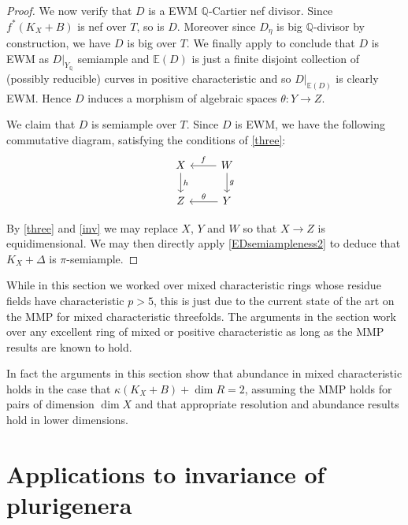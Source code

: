 \documentclass[a4paper,12pt]{book}
\begin{document}
\begin{proof}
		We now verify that $D$ is a EWM $\mathbb{Q}$-Cartier nef divisor.
		Since $f^{*}(K_{X}+B)$ is nef over $T$, so is $D$. Moreover since $D_\eta$ is big $\mathbb{Q}$-divisor by construction, we have $D$ is big over $T$. 
		We finally apply \cite[Theorem 6.1]{witaszek2020keels} to conclude that $D$ is EWM as $D|_{Y_{\mathbb{Q}}}$ semiample and ${\mathbb{E}(D)}$ is just a finite disjoint collection of (possibly reducible) curves in positive characteristic and so $D|_{\mathbb{E}(D)}$ is clearly EWM. Hence $D$ induces a morphism of algebraic spaces $\theta \colon Y \to Z$.
		
		We claim that $D$ is semiample over $T$. 
		Since $D$ is EWM, we have the following commutative diagram, satisfying the conditions of \autoref{three}:
		\[\begin{tikzcd}
		X \arrow[d, "h"] & W \arrow[d, "g"] \arrow[l, "f"'] \\
		Z                & Y \arrow[l, "\theta"']             
		\end{tikzcd}\]
		
		By \autoref{three} and \autoref{inv} we may replace $X$, $Y$ and $W$ so that $X \to Z$ is equidimensional. We may then directly apply \autoref{EDsemiampleness2} to deduce that $K_{X}+\Delta$ is $\pi$-semiample.
	\end{proof}
	
	\begin{remark}
		While in this section we worked over mixed characteristic rings whose residue fields have characteristic $p> 5$, this is just due to the current state of the art on the MMP for mixed characteristic threefolds. The arguments in the section work over any excellent ring of mixed or positive characteristic as long as the MMP results are known to hold.
		
		In fact the arguments in this section show that abundance in mixed characteristic holds in the case that $\kappa(K_{X}+B)+\dim R = 2$, assuming the MMP holds for pairs of dimension $\dim X $ and that appropriate resolution and abundance results hold in lower dimensions. 
	\end{remark}
	
	\section{Applications to invariance of plurigenera}\label{s-inv-plurigenera}
	
\end{document}
